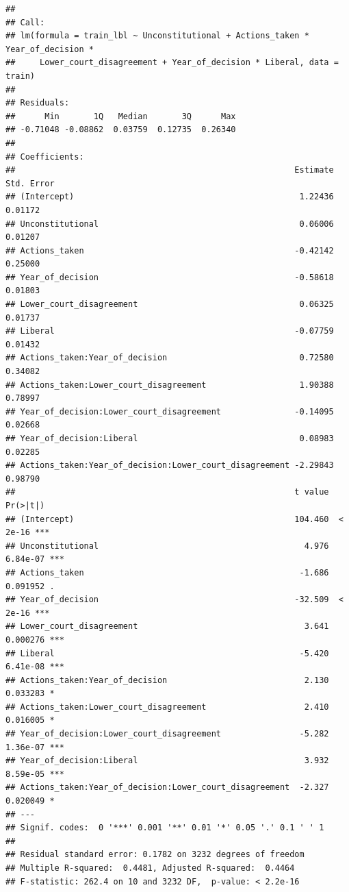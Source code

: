 \documentclass[
]{article}
\begin{document}
\begin{verbatim}
## 
## Call:
## lm(formula = train_lbl ~ Unconstitutional + Actions_taken * Year_of_decision * 
##     Lower_court_disagreement + Year_of_decision * Liberal, data = train)
## 
## Residuals:
##      Min       1Q   Median       3Q      Max 
## -0.71048 -0.08862  0.03759  0.12735  0.26340 
## 
## Coefficients:
##                                                         Estimate Std. Error
## (Intercept)                                              1.22436    0.01172
## Unconstitutional                                         0.06006    0.01207
## Actions_taken                                           -0.42142    0.25000
## Year_of_decision                                        -0.58618    0.01803
## Lower_court_disagreement                                 0.06325    0.01737
## Liberal                                                 -0.07759    0.01432
## Actions_taken:Year_of_decision                           0.72580    0.34082
## Actions_taken:Lower_court_disagreement                   1.90388    0.78997
## Year_of_decision:Lower_court_disagreement               -0.14095    0.02668
## Year_of_decision:Liberal                                 0.08983    0.02285
## Actions_taken:Year_of_decision:Lower_court_disagreement -2.29843    0.98790
##                                                         t value Pr(>|t|)    
## (Intercept)                                             104.460  < 2e-16 ***
## Unconstitutional                                          4.976 6.84e-07 ***
## Actions_taken                                            -1.686 0.091952 .  
## Year_of_decision                                        -32.509  < 2e-16 ***
## Lower_court_disagreement                                  3.641 0.000276 ***
## Liberal                                                  -5.420 6.41e-08 ***
## Actions_taken:Year_of_decision                            2.130 0.033283 *  
## Actions_taken:Lower_court_disagreement                    2.410 0.016005 *  
## Year_of_decision:Lower_court_disagreement                -5.282 1.36e-07 ***
## Year_of_decision:Liberal                                  3.932 8.59e-05 ***
## Actions_taken:Year_of_decision:Lower_court_disagreement  -2.327 0.020049 *  
## ---
## Signif. codes:  0 '***' 0.001 '**' 0.01 '*' 0.05 '.' 0.1 ' ' 1
## 
## Residual standard error: 0.1782 on 3232 degrees of freedom
## Multiple R-squared:  0.4481, Adjusted R-squared:  0.4464 
## F-statistic: 262.4 on 10 and 3232 DF,  p-value: < 2.2e-16
\end{verbatim}
\end{document}
